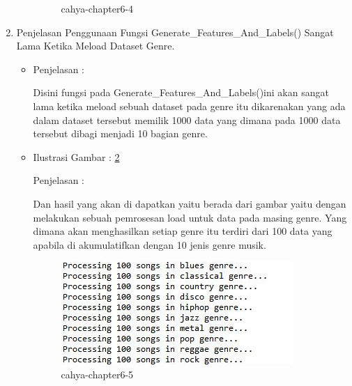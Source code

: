 \begin{enumerate}
\begin{itemize}
\begin{figure}[!hbtp]
\caption{cahya-chapter6-4}
\label{cahya-chapter6-4}
\end{figure}
\par
\end{itemize}
\par
\par
\par
\par
\par
\par
\par
\par
\item Penjelasan Penggunaan Fungsi Generate\_Features\_And\_Labels() Sangat Lama Ketika Meload Dataset Genre.
\begin{itemize}
\par
\item Penjelasan : 
\par Disini fungsi pada Generate\_Features\_And\_Labels()ini akan sangat lama ketika meload sebuah dataset pada genre itu dikarenakan yang ada dalam dataset tersebut memilik 1000 data yang dimana pada 1000 data tersebut dibagi menjadi 10 bagian genre. 
\par
\item Ilustrasi Gambar : \ref{cahya-chapter6-5}
\par Penjelasan :
\par Dan hasil yang akan di dapatkan yaitu berada dari gambar yaitu dengan melakukan sebuah pemrosesan load untuk data pada masing genre. Yang dimana akan menghasilkan setiap genre itu terdiri dari 100 data yang apabila di akumulatifkan dengan 10 jenis genre musik.
\begin{figure}[!hbtp]
\centering
\includegraphics[scale=0.2]{figures/cahya-chapter6-5.jpg}
\caption{cahya-chapter6-5}
\label{cahya-chapter6-5}
\end{figure}
\par
\end{itemize}
\end{enumerate}
\par
\par
\par
